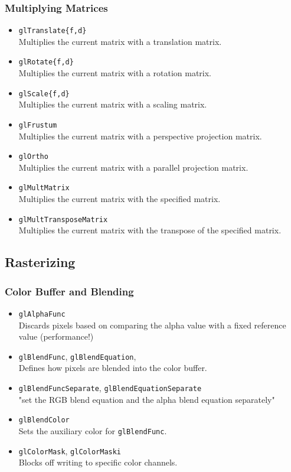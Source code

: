 \documentclass[12pt]{article}
\begin{document}
\subsubsection{Multiplying Matrices}
\begin{itemize}
\item \texttt{glTranslate\{f,d\}} \\
	Multiplies the current matrix with a translation matrix.
\item \texttt{glRotate\{f,d\}} \\
	Multiplies the current matrix with a rotation matrix.
\item \texttt{glScale\{f,d\}} \\
	Multiplies the current matrix with a scaling matrix.
\item \texttt{glFrustum} \\
	Multiplies the current matrix with a perspective projection matrix.
\item \texttt{glOrtho} \\
	Multiplies the current matrix with a parallel projection matrix.
\item \texttt{glMultMatrix} \\
	Multiplies the current matrix with the specified matrix.
\item \texttt{glMultTransposeMatrix} \\
	Multiplies the current matrix with the transpose of the specified matrix.
\end{itemize}



\subsection{Rasterizing}

\subsubsection{Color Buffer and Blending}
\begin{itemize}
\item \texttt{glAlphaFunc} \\
	Discards pixels based on comparing the alpha value with a fixed reference value (performance!)
\item \texttt{glBlendFunc}, \texttt{glBlendEquation},  \\
	Defines how pixels are blended into the color buffer.
\item \texttt{glBlendFuncSeparate}, \texttt{glBlendEquationSeparate} \\
	"set the RGB blend equation and the alpha blend equation separately"
\item \texttt{glBlendColor} \\
	Sets the auxiliary color for \texttt{glBlendFunc}.
\item \texttt{glColorMask}, \texttt{glColorMaski} \\
	Blocks off writing to specific color channels.
\end{itemize}
\end{document}
